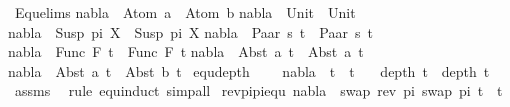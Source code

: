 \begin{isabellebody}
\isanewline
{}\isamarkupfalse%
\ Equ{\isacharunderscore}{\kern0pt}elims{\isacharcolon}{\kern0pt}\isanewline
{\isachardoublequoteopen}nabla\ {\isasymturnstile}\ Atom\ a\ {\isasymapprox}\ Atom\ b{\isachardoublequoteclose}\isanewline
{\isachardoublequoteopen}nabla\ {\isasymturnstile}\ Unit\ {\isasymapprox}\ Unit{\isachardoublequoteclose}\isanewline
{\isachardoublequoteopen}nabla\ {\isasymturnstile}\ Susp\ pi{}\ X\ {\isasymapprox}\ Susp\ pi{}\ X{\isachardoublequoteclose}\isanewline
{\isachardoublequoteopen}nabla\ {\isasymturnstile}\ Paar\ s{}\ t{}\ {\isasymapprox}\ Paar\ s{}\ t{}{\isachardoublequoteclose}\isanewline
{\isachardoublequoteopen}nabla\ {\isasymturnstile}\ Func\ F\ t{}\ {\isasymapprox}\ Func\ F\ t{}{\isachardoublequoteclose}\isanewline
{\isachardoublequoteopen}nabla\ {\isasymturnstile}\ Abst\ a\ t{}\ {\isasymapprox}\ Abst\ a\ t{}{\isachardoublequoteclose}\isanewline
{\isachardoublequoteopen}nabla\ {\isasymturnstile}\ Abst\ a\ t{}\ {\isasymapprox}\ Abst\ b\ t{}{\isachardoublequoteclose}\isanewline
\isanewline
\isanewline
{}\isamarkupfalse%
\ equ{\isacharunderscore}{\kern0pt}depth{\isacharcolon}{\kern0pt}\ \isanewline
\ \ \ {\isachardoublequoteopen}nabla\ {\isasymturnstile}\ t{}\ {\isasymapprox}\ t{}{\isachardoublequoteclose}\isanewline
\ \ \ {\isachardoublequoteopen}depth\ t{}\ {\isacharequal}{\kern0pt}\ depth\ t{}{\isachardoublequoteclose}\isanewline
%
\isadelimproof
\ \ %
\endisadelimproof
%
\isatagproof
{}\isamarkupfalse%
\ assms\ \isamarkupfalse%
\ {\isacharparenleft}{\kern0pt}rule\ equ{\isachardot}{\kern0pt}induct{\isacharcomma}{\kern0pt}\ simp{\isacharunderscore}{\kern0pt}all{\isacharparenright}{\kern0pt}%
\endisatagproof
{\isafoldproof}%
%
\isadelimproof
\isanewline
%
\endisadelimproof
\isanewline
\isanewline
{}\isamarkupfalse%
\ rev{\isacharunderscore}{\kern0pt}pi{\isacharunderscore}{\kern0pt}pi{\isacharunderscore}{\kern0pt}equ{\isacharcolon}{\kern0pt}\ {\isachardoublequoteopen}{\isacharparenleft}{\kern0pt}nabla\ {\isasymturnstile}\ swap\ {\isacharparenleft}{\kern0pt}rev\ pi{\isacharparenright}{\kern0pt}\ {\isacharparenleft}{\kern0pt}swap\ pi\ t{\isacharparenright}{\kern0pt}\ {\isasymapprox}\ t{\isacharparenright}{\kern0pt}{\isachardoublequoteclose}\isanewline
%
\isadelimproof
%
\endisadelimproof
%

\end{isabellebody}
